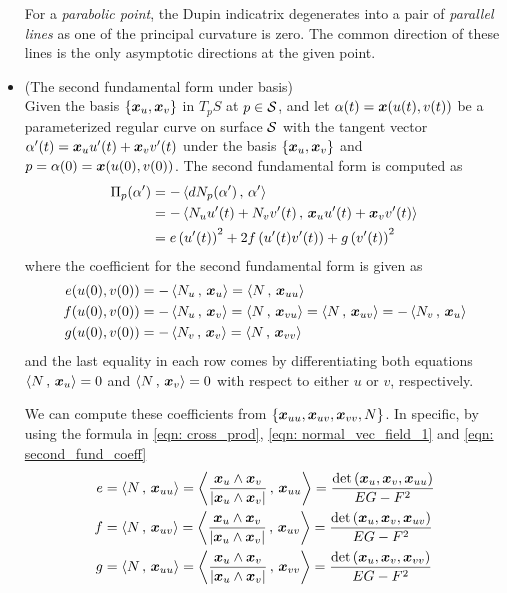 \documentclass[11pt]{article}
\begin{document}
\begin{itemize}
For a \emph{parabolic point}, the Dupin indicatrix degenerates into a pair of \emph{parallel lines} as one of the principal curvature is zero. The common direction of these lines is the only asymptotic directions at the given point. \\


\item (The second fundamental form under basis)\\
Given the basis $\left\{\boldsymbol{x}_{u}, \boldsymbol{x}_{v}\right\}$ in $T_{p}S$ at $p\in {\mathcal S}$, and let $\alpha(t) = \boldsymbol{x}(u(t), v(t))$ be a parameterized regular curve on surface ${\mathcal S}$ with the tangent vector $\alpha'(t) = \boldsymbol{x}_{u}u'(t) + \boldsymbol{x}_{v}v'(t) $ under the basis $\left\{\boldsymbol{x}_{u}, \boldsymbol{x}_{v}\right\}$ and $p=\alpha(0)= \boldsymbol{x}(u(0), v(0))$. The second fundamental form is computed as
\begin{align}
\Pi_{p}(\alpha') &=  -\left\langle dN_{p}(\alpha')\,,\, \alpha' \right\rangle\nonumber\\
&= -\left\langle N_{u}u'(t) + N_{v}v'(t)\,,\,  \boldsymbol{x}_{u}u'(t) + \boldsymbol{x}_{v}v'(t) \right\rangle\nonumber\\
&= e\left(u'(t)\right)^{2} + 2f\left(u'(t)v'(t)\right) + g\left(v'(t)\right)^{2} \label{eqn: second_fund_form_2}
\end{align}
where the coefficient for the second fundamental form is given as 
\begin{align}
e(u(0), v(0))&= - \left\langle N_{u}\,,\, \boldsymbol{x}_{u} \right\rangle = \left\langle N\,,\, \boldsymbol{x}_{uu} \right\rangle \nonumber\\
f(u(0), v(0))&= - \left\langle N_{u}\,,\, \boldsymbol{x}_{v} \right\rangle =  \left\langle N\,,\, \boldsymbol{x}_{vu} \right\rangle =  \left\langle N\,,\, \boldsymbol{x}_{uv} \right\rangle =  -\left\langle N_{v}\,,\, \boldsymbol{x}_{u} \right\rangle\nonumber\\
g(u(0), v(0))&=   - \left\langle N_{v}\,,\, \boldsymbol{x}_{v} \right\rangle = \left\langle N\,,\, \boldsymbol{x}_{vv} \right\rangle  \label{eqn: second_fund_coeff}
\end{align}
and the last equality in each row comes by differentiating both equations $\left\langle N\,,\, \boldsymbol{x}_{u} \right\rangle = 0$ and $\left\langle N\,,\, \boldsymbol{x}_{v} \right\rangle = 0$ with respect to either $u$ or $v$, respectively. 

We can compute these coefficients from $\left\{\boldsymbol{x}_{uu},\boldsymbol{x}_{uv}, \boldsymbol{x}_{vv}, N \right\}$. In specific, by using the formula in \eqref{eqn: cross_prod}, \eqref{eqn: normal_vec_field_1} and \eqref{eqn: second_fund_coeff}
\begin{align}
e &= \left\langle N\,,\, \boldsymbol{x}_{uu} \right\rangle = \left\langle \frac{\boldsymbol{x}_{u} \wedge \boldsymbol{x}_{v}}{\left\lvert \boldsymbol{x}_{u} \wedge \boldsymbol{x}_{v} \right\rvert}\,,\, \boldsymbol{x}_{uu} \right\rangle= \frac{\det\left( \boldsymbol{x}_{u} , \boldsymbol{x}_{v}, \boldsymbol{x}_{uu}  \right)}{EG- F^{2}} \nonumber\\
f &= \left\langle N\,,\, \boldsymbol{x}_{uv} \right\rangle = \left\langle \frac{\boldsymbol{x}_{u} \wedge \boldsymbol{x}_{v}}{\left\lvert \boldsymbol{x}_{u} \wedge \boldsymbol{x}_{v} \right\rvert}\,,\, \boldsymbol{x}_{uv} \right\rangle= \frac{\det\left( \boldsymbol{x}_{u} , \boldsymbol{x}_{v}, \boldsymbol{x}_{uv}  \right)}{EG- F^{2}} \nonumber\\
g &= \left\langle N\,,\, \boldsymbol{x}_{uu} \right\rangle = \left\langle \frac{\boldsymbol{x}_{u} \wedge \boldsymbol{x}_{v}}{\left\lvert \boldsymbol{x}_{u} \wedge \boldsymbol{x}_{v} \right\rvert}\,,\, \boldsymbol{x}_{vv} \right\rangle= \frac{\det\left( \boldsymbol{x}_{u} , \boldsymbol{x}_{v}, \boldsymbol{x}_{vv}  \right)}{EG- F^{2}} \label{eqn: second_fund_coeff_2}
\end{align}




\end{itemize}
\end{document}
